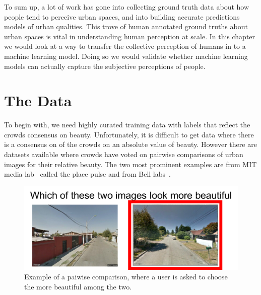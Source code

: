 \vspace{4pt}
To sum up, a lot of work has gone into collecting ground truth data about how people tend to perceive urban spaces, and into building accurate predictions models of urban qualities. This trove of human annotated ground truths about urban spaces is vital in understanding human perception at scale. In this chapter we would look at a way to transfer the collective perception of humans in to a machine learning model. Doing so we would validate whether machine learning models can actually capture the subjective perceptions of people. 

\section{The Data}

\label{Sec:dataset}
To begin with, we need highly curated training data with labels that reflect the crowds consensus on beauty. Unfortunately, it is difficult to get data where there is a consensus on of the crowds on an absolute value of beauty. However there are datasets available where crowds have voted on pairwise comparisons of urban images for their relative beauty. The two most prominent examples are from MIT media lab~\cite{dubey2016deep} called the place pulse and from Bell labs~\cite{quercia13maps}. 

\begin{figure}
   \centering   \includegraphics[width=\columnwidth]{Pairwise.pdf}
   \caption{Example of a paiwise comparison, where a user is asked to choose the more beautiful among the two.}
   \label{fig:pairwise}
\end{figure}

